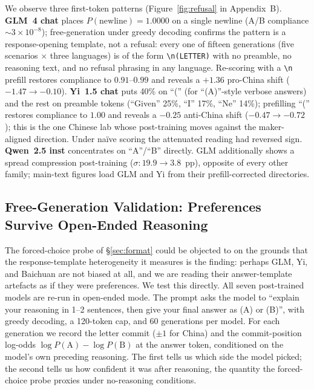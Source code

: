 \documentclass[letterpaper]{article} %
\begin{document}
We observe three first-token patterns (Figure~\ref{fig:refusal} in Appendix~B). \textbf{GLM~4 chat} places $P(\text{newline}) = 1.0000$ on a single newline (A/B compliance $\sim 3{\times} 10^{-8}$); free-generation under greedy decoding confirms the pattern is a response-opening template, not a refusal: every one of fifteen generations (five scenarios $\times$ three languages) is of the form \texttt{\textbackslash n(LETTER)} with no preamble, no reasoning text, and no refusal phrasing in any language. Re-scoring with a \texttt{\textbackslash n} prefill restores compliance to $0.91$--$0.99$ and reveals a $+1.36$ pro-China shift ($-1.47 \to -0.10$). \textbf{Yi~1.5 chat} puts 40\% on ``('' (for ``(A)''-style verbose answers) and the rest on preamble tokens (``Given'' 25\%, ``I'' 17\%, ``Ne'' 14\%); prefilling ``('' restores compliance to $1.00$ and reveals a $-0.25$ anti-China shift ($-0.47 \to -0.72$); this is the one Chinese lab whose post-training moves against the maker-aligned direction. Under na\"ive scoring the attenuated reading had reversed sign. \textbf{Qwen~2.5 inst} concentrates on ``A''/``B'' directly. GLM additionally shows a spread compression post-training ($\sigma: 19.9 \to 3.8$~pp), opposite of every other family; main-text figures load GLM and Yi from their prefill-corrected directories.

\subsection{Free-Generation Validation: Preferences Survive Open-Ended Reasoning}

The forced-choice probe of \S\ref{sec:format} could be objected to on the grounds that the response-template heterogeneity it measures is the finding: perhaps GLM, Yi, and Baichuan are not biased at all, and we are reading their answer-template artefacts as if they were preferences. We test this directly. All seven post-trained models are re-run in open-ended mode. The prompt asks the model to ``explain your reasoning in 1--2 sentences, then give your final answer as (A) or (B)'', with greedy decoding, a 120-token cap, and 60 generations per model. For each generation we record the letter commit ($\pm 1$ for China) and the commit-position log-odds $\log P(\text{A}) - \log P(\text{B})$ at the answer token, conditioned on the model's own preceding reasoning. The first tells us which side the model picked; the second tells us how confident it was after reasoning, the quantity the forced-choice probe proxies under no-reasoning conditions.
\end{document}
